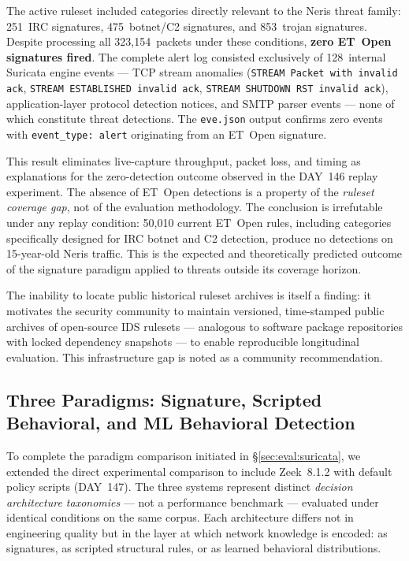 \documentclass[11pt,a4paper]{article}
\begin{document}
    The active ruleset included categories directly relevant to the Neris threat family:
    251~IRC signatures, 475~botnet/C2 signatures, and 853~trojan signatures. Despite
    processing all 323,154~packets under these conditions, \textbf{zero ET~Open signatures
    fired}. The complete alert log consisted exclusively of 128~internal Suricata engine
    events --- TCP stream anomalies (\texttt{STREAM Packet with invalid ack},
    \texttt{STREAM ESTABLISHED invalid ack}, \texttt{STREAM SHUTDOWN RST invalid ack}),
    application-layer protocol detection notices, and SMTP parser events --- none of which
    constitute threat detections. The \texttt{eve.json} output confirms zero events with
    \texttt{event\_type: alert} originating from an ET~Open signature.

    This result eliminates live-capture throughput, packet loss, and timing as explanations
    for the zero-detection outcome observed in the DAY~146 replay experiment. The absence
    of ET~Open detections is a property of the \emph{ruleset coverage gap}, not of the
    evaluation methodology. The conclusion is irrefutable under any replay condition:
    50,010 current ET~Open rules, including categories specifically designed for IRC
    botnet and C2 detection, produce no detections on 15-year-old Neris traffic.
    This is the expected and theoretically predicted outcome of the signature paradigm
    applied to threats outside its coverage horizon.

    The inability to locate public historical ruleset archives is itself a finding: it
    motivates the security community to maintain versioned, time-stamped public archives
    of open-source IDS rulesets --- analogous to software package repositories with
    locked dependency snapshots --- to enable reproducible longitudinal evaluation. This
    infrastructure gap is noted as a community recommendation.

    \subsection{Three Paradigms: Signature, Scripted Behavioral, and ML Behavioral Detection}
    \label{sec:eval:threeparadigms}

    To complete the paradigm comparison initiated in \S\ref{sec:eval:suricata}, we
    extended the direct experimental comparison to include Zeek~8.1.2 with default
    policy scripts (DAY~147). The three systems represent distinct \emph{decision architecture taxonomies} ---
    not a performance benchmark --- evaluated under identical conditions on the same corpus.
    Each architecture differs not in engineering quality but in the layer at which network
    knowledge is encoded: as signatures, as scripted structural rules, or as learned behavioral
    distributions.
\end{document}
